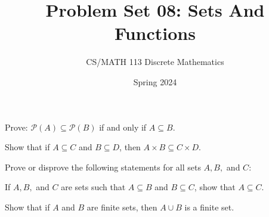 \documentclass[a4paper]{exam}
\title{Problem Set 08: Sets And Functions}
\author{CS/MATH 113 Discrete Mathematics}
\date{Spring 2024}
\theoremstyle{definition}
\begin{document}
\maketitle

\begin{questions}
\question 
  Prove: $\mathcal{P}(A) \subseteq \mathcal{P}(B)$ if and only if $A \subseteq B$.

  \begin{solution}
  \end{solution}


\question Show that if \(A \subseteq C\) and \(B \subseteq D\), then \(A \times B \subseteq C \times D\).

  \begin{solution}
  \end{solution}
  
\question Prove or disprove the following statements for all sets $A, B,$ and $C$:
  
\question If $A, B,$ and $C$ are sets such that $A \subseteq B$ and $B \subseteq C$, show that $A \subseteq C$.

  \begin{solution}
  \end{solution}

\question Show that if $A$ and $B$ are finite sets, then  \( A \cup B \) is a finite set.

  \begin{solution}
  \end{solution}
  

\end{questions}
\end{document}
